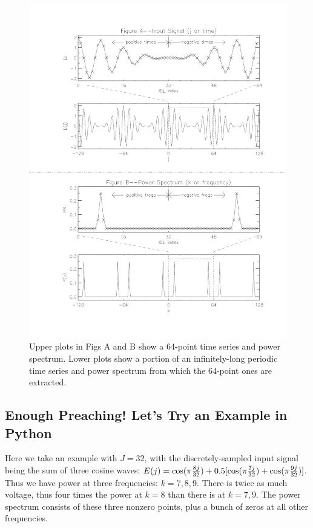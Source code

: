 \documentclass[preprint]{aastex}
\begin{document}
\begin{figure}[H]
\begin{center}
\leavevmode
\includegraphics[width=6.0in]{fourierbfig.pdf}
\end{center}
\label{figtwo}
\caption{Upper plots in Figs A and B show a 64-point time series and
power spectrum. Lower plots show a portion of an infinitely-long
periodic time series and power spectrum from which the 64-point ones are
extracted.  }
\end{figure}

\subsection{ Enough Preaching! Let's Try an Example in Python}

	Here we take an example with $J=32$, with the discretely-sampled
input signal being the sum of three cosine waves: $E(j) = \cos(\pi {8j
\over 32}) + 0.5[\cos(\pi {7j \over 32}) + \cos(\pi {9j \over 32})]$. 
Thus we have power at three frequencies: $k=7, 8, 9$.  There is twice as
much voltage, thus four times the power at $k=8$ than there is at $k=7,
9$.  The power spectrum consists of these three nonzero points, plus a
bunch of zeros at all other frequencies.
\end{document}
